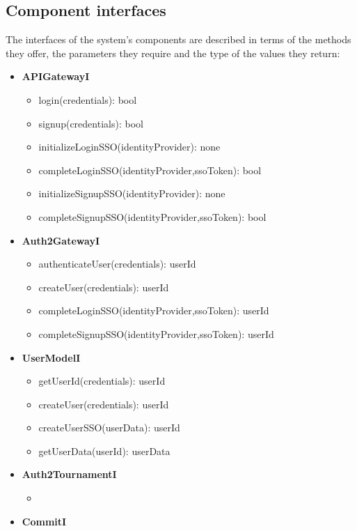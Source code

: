 \subsection{Component interfaces}
The interfaces of the system's components are described in terms of the methods they offer, the parameters they require and the type of the values they return:
\begin{itemize}
    \item \textbf{APIGatewayI}
    \begin{itemize}
        \item login(credentials): bool
        \item signup(credentials): bool
        \item initializeLoginSSO(identityProvider): none
        \item completeLoginSSO(identityProvider,ssoToken): bool
        \item initializeSignupSSO(identityProvider): none
        \item completeSignupSSO(identityProvider,ssoToken): bool
    \end{itemize}
    \item \textbf{Auth2GatewayI}
    \begin{itemize}
        \item authenticateUser(credentials): userId
        \item createUser(credentials): userId
        \item completeLoginSSO(identityProvider,ssoToken): userId
        \item completeSignupSSO(identityProvider,ssoToken): userId
    \end{itemize}
    \item \textbf{UserModelI}
    \begin{itemize}
        \item getUserId(credentials): userId
        \item createUser(credentials): userId
        \item createUserSSO(userData): userId
        \item getUserData(userId): userData
    \end{itemize}
    \item \textbf{Auth2TournamentI}
    \begin{itemize}
        \item 
    \end{itemize}
    \item \textbf{CommitI}
    \begin{itemize}

\end{itemize}
\end{itemize}
